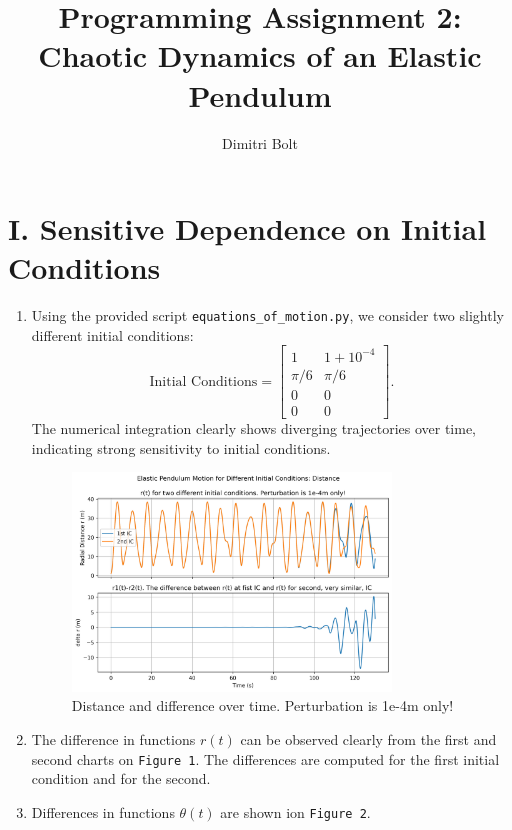 \documentclass{article}
\title{Programming Assignment 2: Chaotic Dynamics of an Elastic Pendulum}
\author{Dimitri Bolt}
\date{}
\begin{document}
	
	\maketitle
	
	\section*{I. Sensitive Dependence on Initial Conditions}
	
	\begin{enumerate}
		\item Using the provided script \texttt{equations\_of\_motion.py}, we consider two slightly different initial conditions:
		\[
		\text{Initial Conditions} = \begin{bmatrix}
			1 & 1+10^{-4} \\
			\pi/6 & \pi/6 \\
			0 & 0 \\
			0 & 0
		\end{bmatrix}.
		\]
		The numerical integration clearly shows diverging trajectories over time, indicating strong sensitivity to initial conditions.
			\begin{figure}[h!]
				\centering
				\includegraphics[width=0.8\textwidth]{elastic_pendulum_r.png}
				\caption{Distance and difference over time. Perturbation is 1e-4m only!}
			\end{figure}
		
		\item The difference in functions $r(t)$ can be observed clearly from the first and second charts on \texttt{Figure 1}. The differences are computed for the first initial condition and for the second.
		
		\item Differences in functions $\theta(t)$ are shown ion \texttt{Figure 2}.
		

\end{enumerate}
\end{document}
